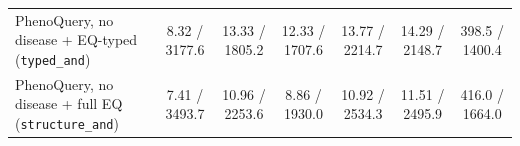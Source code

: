\begin{landscape}
\begin{table}[p]
\begin{tabular}{lcccccc}
PhenoQuery, no disease + EQ-typed (\texttt{typed\_and}) & 8.32 / 3177.6 & 13.33 / 1805.2 & 12.33 / 1707.6 & 13.77 / 2214.7 & 14.29 / 2148.7 & 398.5 / 1400.4 \\
PhenoQuery, no disease + full EQ (\texttt{structure\_and}) & 7.41 / 3493.7 & 10.96 / 2253.6 & 8.86 / 1930.0 & 10.92 / 2534.3 & 11.51 / 2495.9 & 416.0 / 1664.0 \\
\bottomrule
\end{tabular}
\end{table}
\clearpage
\end{landscape}

